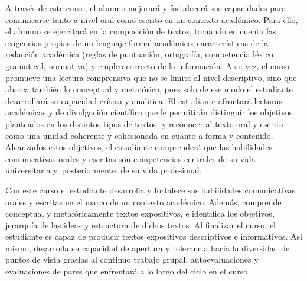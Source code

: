 \begin{syllabus}


\begin{justification}
A través de este curso, el alumno mejorará y fortalecerá sus capacidades para comunicarse tanto a nivel oral como escrito en un contexto académico. Para ello, el alumno se ejercitará en la composición de textos, tomando en cuenta las exigencias propias de un lenguaje formal académico: características de la redacción académica (reglas de puntuación, ortografía, competencia léxico gramatical, normativa) y empleo correcto de la información. A su vez, el curso promueve una lectura comprensiva que no se limita al nivel descriptivo, sino que abarca también lo conceptual y metafórico, pues solo de ese modo el estudiante desarrollará su capacidad crítica y analítica. El estudiante afrontará lecturas académicas y de divulgación científica que le permitirán distinguir los objetivos planteados en los distintos tipos de textos, y reconocer al texto oral y escrito como una unidad coherente y cohesionada en cuanto a forma y contenido. Alcanzados estos objetivos, el estudiante comprenderá que las habilidades comunicativas orales y escritas son competencias centrales de su vida universitaria y, posteriormente, de su vida profesional. 
\end{justification}

\begin{goals}
\item Con este curso el estudiante desarrolla y fortalece sus habilidades comunicativas orales y escritas en el marco de un contexto académico. Además, comprende conceptual y metafóricamente textos expositivos, e identifica los objetivos, jerarquía de las ideas y estructura de dichos textos. Al finalizar el curso, el estudiante es capaz de producir textos expositivos descriptivos e informativos. Así mismo, desarrolla su capacidad de apertura y tolerancia hacia la diversidad de puntos de vista gracias al continuo trabajo grupal, autoevaluaciones y evaluaciones de pares que enfrentará a lo largo del ciclo en el curso. 
\end{goals}

\begin{outcomes}   
     \item {}
     \item {}
     \item {}
     \item {}
\end{outcomes}


\end{syllabus}
